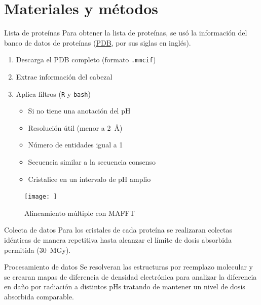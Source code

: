 \documentclass{beamer}
\begin{document}
\section{Materiales y métodos}
\begin{frame}{Lista de proteínas}
Para obtener la lista de proteínas, se usó la información del banco de datos de proteínas (\href{https://www.rcsb.org/}{PDB}, por sus siglas en inglés).
  \begin{enumerate}
    \item Descarga el PDB completo (formato \texttt{.mmcif})
    \item Extrae información del cabezal
    \item Aplica filtros (\texttt{R} y \texttt{bash})
    \begin{itemize}
      \item Si no tiene una anotación del pH
      \item Resolución útil (menor a \SI{2}{\angstrom})
      \item Número de entidades igual a 1
      \item Secuencia similar a la secuencia consenso
      \item Cristalice en un intervalo de pH amplio
    \end{itemize}
  \end{enumerate}
\end{frame}
\begin{frame}{}
 \begin{figure}
   \centering
   \texttt{[image: ]}
   \caption{Alineamiento múltiple con MAFFT \cite{Katoh2012}}
 \end{figure} 
\end{frame}
\begin{frame}{}
  
\end{frame}
\begin{frame}{Colecta de datos}
	Para los cristales de cada proteína se realizaran colectas idénticas de manera repetitiva hasta alcanzar el límite de dosis absorbida permitida (\SI{30}{\mega\gray}).
\end{frame}
\begin{frame}{Procesamiento de datos}
Se resolveran las estructuras por reemplazo molecular y se crearan mapas de diferencia de densidad electrónica para analizar la diferencia en daño por radiación a distintos pHs tratando de mantener un nivel de dosis absorbida comparable.
\end{frame}
\end{document}
